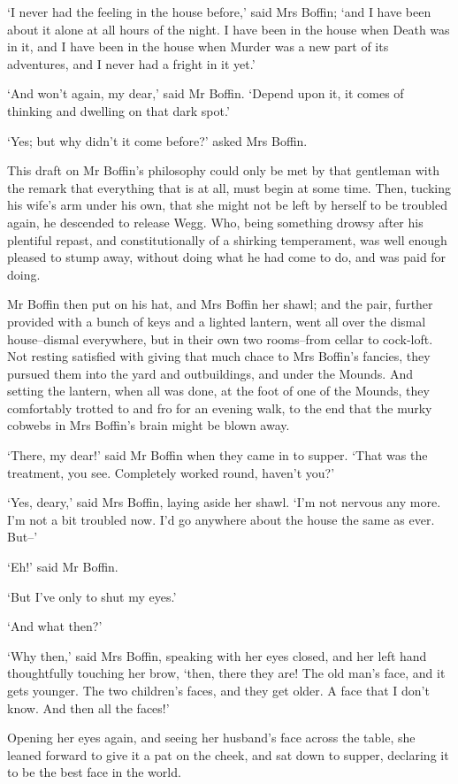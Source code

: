 ‘I never had the feeling in the house before,’ said Mrs Boffin; ‘and I
have been about it alone at all hours of the night. I have been in the
house when Death was in it, and I have been in the house when Murder was
a new part of its adventures, and I never had a fright in it yet.’

‘And won’t again, my dear,’ said Mr Boffin. ‘Depend upon it, it comes of
thinking and dwelling on that dark spot.’

‘Yes; but why didn’t it come before?’ asked Mrs Boffin.

This draft on Mr Boffin’s philosophy could only be met by that gentleman
with the remark that everything that is at all, must begin at some time.
Then, tucking his wife’s arm under his own, that she might not be left
by herself to be troubled again, he descended to release Wegg. Who,
being something drowsy after his plentiful repast, and constitutionally
of a shirking temperament, was well enough pleased to stump away,
without doing what he had come to do, and was paid for doing.

Mr Boffin then put on his hat, and Mrs Boffin her shawl; and the pair,
further provided with a bunch of keys and a lighted lantern, went
all over the dismal house--dismal everywhere, but in their own two
rooms--from cellar to cock-loft. Not resting satisfied with giving that
much chace to Mrs Boffin’s fancies, they pursued them into the yard and
outbuildings, and under the Mounds. And setting the lantern, when all
was done, at the foot of one of the Mounds, they comfortably trotted to
and fro for an evening walk, to the end that the murky cobwebs in Mrs
Boffin’s brain might be blown away.

‘There, my dear!’ said Mr Boffin when they came in to supper. ‘That was
the treatment, you see. Completely worked round, haven’t you?’

‘Yes, deary,’ said Mrs Boffin, laying aside her shawl. ‘I’m not nervous
any more. I’m not a bit troubled now. I’d go anywhere about the house
the same as ever. But--’

‘Eh!’ said Mr Boffin.

‘But I’ve only to shut my eyes.’

‘And what then?’

‘Why then,’ said Mrs Boffin, speaking with her eyes closed, and her
left hand thoughtfully touching her brow, ‘then, there they are! The old
man’s face, and it gets younger. The two children’s faces, and they get
older. A face that I don’t know. And then all the faces!’

Opening her eyes again, and seeing her husband’s face across the table,
she leaned forward to give it a pat on the cheek, and sat down to
supper, declaring it to be the best face in the world.


